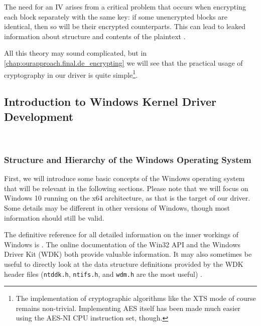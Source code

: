 The need for an IV arises from a critical problem that occurs when encrypting each block separately with the same key: if some unencrypted blocks are identical, then so will be their encrypted counterparts. This can lead to leaked information about structure and contents of the plaintext \cite{Ferguson2010}.

All this theory may sound complicated, but in \autoref{chap:ourapproach.final.de_encrypting} we will see that the practical usage of cryptography in our driver is quite simple\footnote{\label{fn:background.luks2.simplecryptography} The implementation of cryptographic algorithms like the XTS mode of course remains non-trivial. Implementing AES itself has been made much easier using the AES-NI CPU instruction set, though.}.

\subsection{Introduction to Windows Kernel Driver Development}
\label{chap:background.kerneldriver}
\\

\subsubsection{Structure and Hierarchy of the Windows Operating System}
\label{chap:background.kerneldriver.oshierarchy}
First, we will introduce some basic concepts of the Windows operating system that will be relevant in the following sections. Please note that we will focus on Windows 10 running on the x64 architecture, as that is the target of our driver. Some details may be different in other versions of Windows, though most information should still be valid.

The definitive reference for all detailed information on the inner workings of Windows is \cite{Yosifovich2017}. The online documentation of the Win32 API \cite{Win32} and the Windows Driver Kit (WDK) \cite{Wdk} both provide valuable information. It may also sometimes be useful to directly look at the data structure definitions provided by the WDK header files (\texttt{ntddk.h}, \texttt{ntifs.h}, and \texttt{wdm.h} are the most useful) \cite{Yosifovich2017}.

